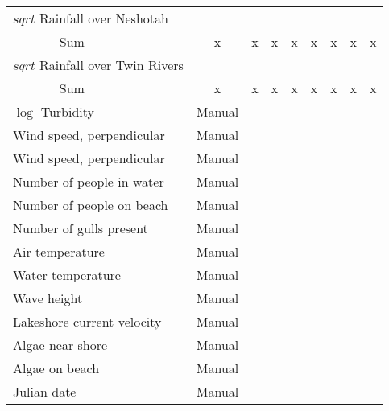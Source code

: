 \documentclass[12pt]{article}
\begin{document}
\begin{table}
{\begin{minipage}{\textwidth}
\begin{tabular}{ll|cccccccc}
        \hline
        \multicolumn{2}{l|}{$sqrt$ Rainfall over Neshotah} &&&&&&&& \\
        & Sum & x & x & x & x & x & x & x & x \\
        \hline
        \multicolumn{2}{l|}{$sqrt$ Rainfall over Twin Rivers} &&&&&&&& \\
        & Sum & x & x & x & x & x & x & x & x \\
        \hline
        \multicolumn{2}{l|}{$\log$ Turbidity} & Manual&&&&&&& \\
        \hline
        \multicolumn{2}{l|}{Wind speed, perpendicular} & Manual&&&&&&& \\
        \hline
        \multicolumn{2}{l|}{Wind speed, perpendicular} & Manual&&&&&&& \\
        \hline
        \multicolumn{2}{l|}{Number of people in water} & Manual&&&&&&& \\
        \hline
        \multicolumn{2}{l|}{Number of people on beach} & Manual&&&&&&& \\
        \hline
        \multicolumn{2}{l|}{Number of gulls present} & Manual&&&&&&& \\
        \hline
        \multicolumn{2}{l|}{Air temperature} & Manual&&&&&&& \\
        \hline
        \multicolumn{2}{l|}{Water temperature} & Manual&&&&&&& \\
        \hline
        \multicolumn{2}{l|}{Wave height} & Manual&&&&&&& \\
        \hline
        \multicolumn{2}{l|}{Lakeshore current velocity} & Manual&&&&&&& \\
        \hline
        \multicolumn{2}{l|}{Algae near shore} & Manual&&&&&&& \\
        \hline
        \multicolumn{2}{l|}{Algae on beach} & Manual&&&&&&& \\
        \hline
        \multicolumn{2}{l|}{Julian date} & Manual&&&&&&& \\
        \hline
        \end{tabular}
        \end{minipage}}
\end{table}
\end{document}
